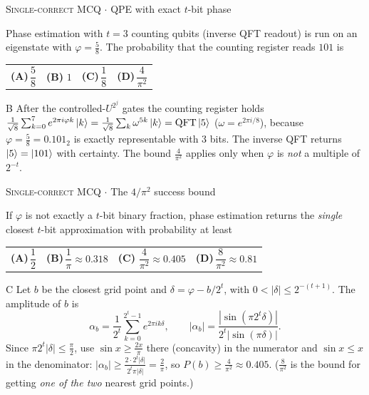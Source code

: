 \documentclass[11pt,a4paper]{article}
\newcommand{\optlabel}[1]{\textbf{(#1)}}
\newcommand{\correctlabel}[1]{\textcolor{okgreen}{\textbf{(#1)}\,\ding{51}}}
\newenvironment{qitem}[1]{\begin{list}{}{\setlength{\leftmargin}{3.3em}\setlength{\labelwidth}{3.1em}%
  \setlength{\labelsep}{0.2em}\setlength{\topsep}{3pt}\setlength{\parsep}{3pt}}\item[\textbf{Q.#1}\hfill]}{\end{list}}
\newcommand{\qsep}{\par\vspace{2pt}{\color{black!15}\hrule}\vspace{4pt}}
\newcommand{\qmeta}[2]{{\footnotesize\color{black!60}\textsc{#1} \;$\cdot$\; #2}\par}
\begin{document}
\begin{qitem}{65}
\qmeta{Single-correct MCQ}{QPE with exact $t$-bit phase}
Phase estimation with $t = 3$ counting qubits (inverse QFT readout) is run on an eigenstate with $\varphi = \frac58$.
The probability that the counting register reads $101$ is
\par\smallskip\noindent\begin{tabularx}{\linewidth}{@{}*{4}{L}@{}}
\optlabel{A}\,$\dfrac58$ & \correctlabel{B}\,$1$ & \optlabel{C}\,$\dfrac18$ & \optlabel{D}\,$\dfrac{4}{\pi^2}$
\end{tabularx}
\end{qitem}
\begin{solbox}{B}
After the controlled-$U^{2^j}$ gates the counting register holds
$\frac{1}{\sqrt8}\sum_{k=0}^{7}e^{2\pi i\varphi k}\ket{k} = \frac{1}{\sqrt8}\sum_k\omega^{5k}\ket k = \mathrm{QFT}\ket{5}$ ($\omega = e^{2\pi i/8}$),
because $\varphi = \frac58 = 0.101_2$ is exactly representable with 3 bits. The inverse QFT returns $\ket{5} = \ket{101}$ with
certainty. The bound $\frac{4}{\pi^2}$ applies only when $\varphi$ is \emph{not} a multiple of $2^{-t}$.
\end{solbox}
\qsep

\begin{qitem}{66}
\qmeta{Single-correct MCQ}{The $4/\pi^2$ success bound}
If $\varphi$ is not exactly a $t$-bit binary fraction, phase estimation returns the \emph{single} closest $t$-bit
approximation with probability at least
\par\smallskip\noindent\begin{tabularx}{\linewidth}{@{}*{4}{L}@{}}
\optlabel{A}\,$\dfrac12$ & \optlabel{B}\,$\dfrac1\pi \approx 0.318$ & \correctlabel{C}\,$\dfrac{4}{\pi^2} \approx 0.405$ & \optlabel{D}\,$\dfrac{8}{\pi^2} \approx 0.81$
\end{tabularx}
\end{qitem}
\begin{solbox}{C}
Let $b$ be the closest grid point and $\delta = \varphi - b/2^t$, with $0 < |\delta| \le 2^{-(t+1)}$. The amplitude of $b$ is
\[ \alpha_b = \frac{1}{2^t}\sum_{k=0}^{2^t-1}e^{2\pi i k\delta}, \qquad |\alpha_b| = \frac{|\sin(\pi 2^t\delta)|}{2^t|\sin(\pi\delta)|}. \]
Since $\pi2^t|\delta| \le \frac\pi2$, use $\sin x \ge \frac{2x}{\pi}$ there (concavity) in the numerator and $\sin x \le x$ in the
denominator: $|\alpha_b| \ge \frac{2\cdot2^t|\delta|}{2^t\pi|\delta|} = \frac{2}{\pi}$, so $P(b) \ge \frac{4}{\pi^2} \approx 0.405$.
($\frac{8}{\pi^2}$ is the bound for getting \emph{one of the two} nearest grid points.)
\end{solbox}
\qsep
\end{document}
